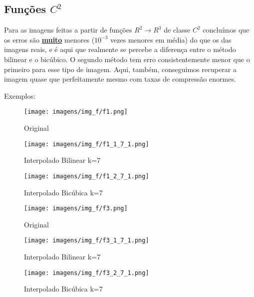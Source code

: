 \documentclass[12pt]{article}
\newcommand{\mytitle}[1]{\textbf{\underline{#1}}}
\begin{document}
\subsection{Funções $C^2$}
Para as imagens feitas a partir de funções $R^2\to R^3$ de classe $C^2$ concluímos que os erros são \mytitle{muito} menores ($10^{-3}$ vezes menores em média) do que os das imagens reais, e é aqui que realmente se percebe a diferença entre o método bilinear e o bicúbico. O segundo método tem erro consistentemente menor que o primeiro para esse tipo de imagem. Aqui, também, conseguimos recuperar a imagem quase que perfeitamente mesmo com taxas de compressão enormes.

Exemplos:
\begin{figure}[H]
  \centering
  \begin{minipage}{.5\textwidth}
    \centering
    \texttt{[image: imagens/img\_f/f1.png]}
    \caption{Original}
  \end{minipage}
  \begin{minipage}{.5\linewidth}
  \end{minipage}
  \begin{minipage}{.5\textwidth}
    \centering
    \texttt{[image: imagens/img\_f/f1\_1\_7\_1.png]}
    \caption{Interpolado Bilinear k=7}
  \end{minipage}%
  \begin{minipage}{.5\textwidth}
    \centering
    \texttt{[image: imagens/img\_f/f1\_2\_7\_1.png]}
    \caption{Interpolado Bicúbica k=7}
  \end{minipage}
\end{figure}

\begin{figure}[H]
  \centering
  \begin{minipage}{.5\textwidth}
    \centering
    \texttt{[image: imagens/img\_f/f3.png]}
    \caption{Original}
  \end{minipage}
  \begin{minipage}{.5\linewidth}
  \end{minipage}
  \begin{minipage}{.5\textwidth}
    \centering
    \texttt{[image: imagens/img\_f/f3\_1\_7\_1.png]}
    \caption{Interpolado Bilinear k=7}
  \end{minipage}%
  \begin{minipage}{.5\textwidth}
    \centering
    \texttt{[image: imagens/img\_f/f3\_2\_7\_1.png]}
    \caption{Interpolado Bicúbica k=7}
  \end{minipage}
\end{figure}
\end{document}
